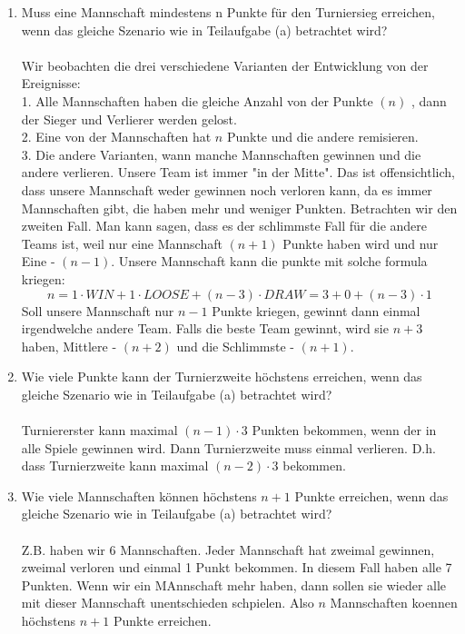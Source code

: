 \begin{enumerate}[label=(\alph*)]
        \item Muss eine Mannschaft mindestens n Punkte für den Turniersieg erreichen, wenn das
		gleiche Szenario wie in Teilaufgabe (a) betrachtet wird? \\ \\
         Wir beobachten die drei verschiedene Varianten der Entwicklung von der Ereignisse: \\
        1. Alle Mannschaften haben die gleiche Anzahl von der Punkte $(n)$ , dann der Sieger und 
        Verlierer werden gelost. \\
        2. Eine von der Mannschaften hat $n$ Punkte und die andere remisieren. \\
        3. Die andere Varianten, wann manche Mannschaften gewinnen und die andere verlieren. Unsere 
        Team ist immer "in der Mitte". Das ist offensichtlich, dass unsere Mannschaft weder gewinnen 
        noch verloren kann, da es immer Mannschaften gibt, die haben mehr und weniger Punkten.
        Betrachten wir den zweiten Fall. Man kann sagen, dass es der schlimmste Fall für die 
        andere Teams ist, weil nur eine Mannschaft  $(n+1)$ Punkte haben wird und nur Eine - $(n-1)$. 
        Unsere Mannschaft kann die punkte mit solche formula kriegen:
        $$n= 1 \cdot WIN + 1\cdot LOOSE + (n-3) \cdot DRAW = 3 + 0 + (n-3)\cdot 1 $$ 
        Soll unsere Mannschaft nur $n-1$ Punkte kriegen, gewinnt dann einmal irgendwelche andere 
        Team. Falls die beste Team gewinnt, wird sie $n+3$ haben, Mittlere - $(n+2)$ und die 
        Schlimmste - $(n+1)$.
        
        \item Wie viele Punkte kann der Turnierzweite höchstens erreichen, wenn das gleiche Szenario
		wie in Teilaufgabe (a) betrachtet wird? \\\\
		Turniererster kann maximal $(n-1)\cdot 3$ Punkten bekommen, wenn der in alle Spiele gewinnen 
		wird. Dann Turnierzweite muss einmal verlieren. D.h. dass Turnierzweite kann maximal 
		$(n-2)\cdot 3$ bekommen.
        
        \item Wie viele Mannschaften können höchstens $n + 1$ Punkte erreichen, wenn das gleiche
		Szenario wie in Teilaufgabe (a) betrachtet wird? \\\\
		Z.B. haben wir 6 Mannschaften. Jeder Mannschaft hat zweimal gewinnen, zweimal verloren und
		einmal 1 Punkt bekommen. In diesem Fall haben alle 7 Punkten. Wenn wir ein MAnnschaft mehr haben,
		dann sollen sie wieder alle mit dieser Mannschaft unentschieden schpielen.
		Also $n$ Mannschaften koennen höchstens $n + 1$ Punkte erreichen.
        

\end{enumerate}
